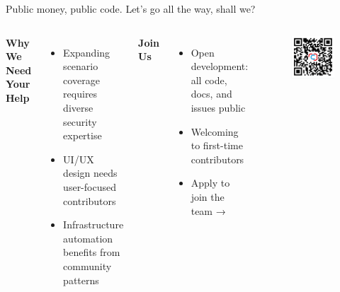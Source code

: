 \documentclass[aspectratio=169]{beamer}
\begin{document}
\begin{frame}[squeeze]{Public money, public code. Let's go all the way, shall we?}
  \begin{columns}[T]
    \textbf{Why We Need Your Help}
    \begin{itemize}
      \item Expanding scenario coverage requires diverse security expertise
      \item UI/UX design needs user-focused contributors
      \item Infrastructure automation benefits from community patterns
    \end{itemize}
    
    \textbf{Join Us}
    \begin{itemize}
      \item Open development: all code, docs, and issues public
      \item Welcoming to first-time contributors
      \item Apply to join the team →
    \end{itemize}
    
    \vspace{10mm}
    \begin{figure}
      \centering
      \includegraphics[width=\textwidth]{images/work-with-us-qrcode.png}
    \end{figure}
  \end{columns}
\end{frame}
\end{document}
